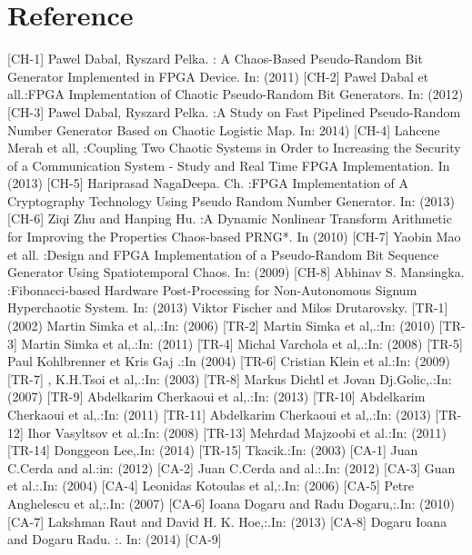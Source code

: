 \documentclass[English, runningheads,a4paper]{llncs}
\begin{document}
\section{Reference}
\begin{thebibliography}{4}

 [CH-1] Pawel Dabal, Ryszard Pelka. : A Chaos-Based Pseudo-Random Bit Generator Implemented in FPGA Device. In: (2011)
[CH-2] Pawel Dabal et all.:FPGA Implementation of Chaotic Pseudo-Random Bit Generators. In: (2012)
[CH-3] Pawel Dabal, Ryszard Pelka. :A Study on Fast Pipelined Pseudo-Random Number Generator Based on Chaotic Logistic Map. In: 2014)  
[CH-4] Lahcene Merah et all, :Coupling Two Chaotic Systems in Order to Increasing the Security of a Communication System - Study and Real Time FPGA Implementation. In (2013) 
[CH-5] Hariprasad  NagaDeepa. Ch. :FPGA Implementation of A Cryptography Technology Using Pseudo Random Number Generator. In: (2013)   
[CH-6] Ziqi Zhu and Hanping Hu. :A Dynamic Nonlinear Transform Arithmetic for Improving the Properties Chaos-based PRNG*. In (2010) 
[CH-7] Yaobin Mao et all. :Design and FPGA Implementation of a Pseudo-Random Bit  Sequence Generator Using Spatiotemporal Chaos. In: (2009)
[CH-8] Abhinav S. Mansingka. :Fibonacci-based Hardware Post-Processing for Non-Autonomous Signum Hyperchaotic System. In: (2013)
Viktor Fischer and Milos Drutarovsky. [TR-1]  (2002)
Martin Simka et al,.:In: (2006) [TR-2] 
Martin Simka et al,.:In: (2010) [TR-3]  
Martin Simka et al,.:In: (2011) [TR-4] 
Michal Varchola et al,.:In: (2008) [TR-5] 
Paul Kohlbrenner et Kris Gaj .:In  (2004) [TR-6] 
Cristian Klein et al.:In: (2009) [TR-7] ,
K.H.Tsoi et al,.:In: (2003) [TR-8] 
Markus Dichtl et Jovan Dj.Golic,.:In: (2007) [TR-9] 
Abdelkarim Cherkaoui et al,.:In: (2013) [TR-10]
Abdelkarim Cherkaoui et al,.:In: (2011) [TR-11]
Abdelkarim Cherkaoui et al,.:In: (2013) [TR-12] 
Ihor Vasyltsov et al.:In: (2008) [TR-13] 
Mehrdad Majzoobi et al.:In: (2011) [TR-14] 
Donggeon Lee,.In: (2014) [TR-15]
Tkacik.:In: (2003) [CA-1] 
Juan C.Cerda and al.:in: (2012) [CA-2] 
Juan C.Cerda and al.:.In: (2012) [CA-3] 
Guan et al.:.In: (2004) [CA-4] 
Leonidas Kotoulas et al,:.In: (2006) [CA-5] 
Petre Anghelescu et al,:.In: (2007) [CA-6] 
Ioana Dogaru and Radu Dogaru,:.In: (2010) [CA-7] 
Lakshman Raut and David H. K. Hoe,:.In: (2013) [CA-8] 
Dogaru Ioana and Dogaru Radu. :. In: (2014) [CA-9] 
  
\end{thebibliography}
\end{document}
